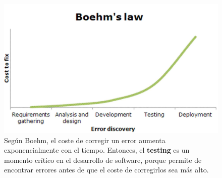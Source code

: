 \begin{figure}[htbp]
   \centering
   \includegraphics{images/01/boehm.png}
   \caption{Según Boehm, el coste de corregir un error aumenta exponencialmente con el tiempo. Entonces, el \textbf{testing} es un momento crítico en el desarrollo de software, porque permite de encontrar errores antes de que el coste de corregirlos sea más alto.}
   \label{fig:01/boehm}
\end{figure}